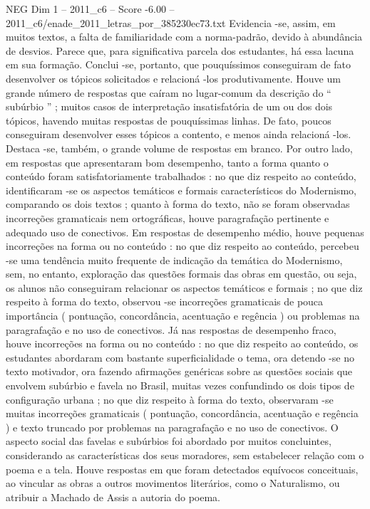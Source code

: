 \begin{textsample}{NEG Dim 1 – 2011\_c6 – Score -6.00 – 2011\_c6/enade\_2011\_letras\_por\_385230ec73.txt}
Evidencia -se, assim, em muitos textos, a falta de familiaridade com a norma-padrão, devido à abundância de desvios.
Parece que, para significativa parcela dos estudantes, há essa lacuna em sua formação.
Conclui -se, portanto, que pouquíssimos conseguiram de fato desenvolver os tópicos solicitados e relacioná -los produtivamente.
Houve um grande número de respostas que caíram no lugar-comum da descrição do “ subúrbio ” ; muitos casos de interpretação insatisfatória de um ou dos dois tópicos, havendo muitas respostas de pouquíssimas linhas.
De fato, poucos conseguiram desenvolver esses tópicos a contento, e menos ainda relacioná -los.
Destaca -se, também, o grande volume de respostas em branco.
Por outro lado, em respostas que apresentaram bom desempenho, tanto a forma quanto o conteúdo foram satisfatoriamente trabalhados : no que diz respeito ao conteúdo, identificaram -se os aspectos temáticos e formais característicos do Modernismo, comparando os dois textos ; quanto à forma do texto, não se foram observadas incorreções gramaticais nem ortográficas, houve paragrafação pertinente e adequado uso de conectivos.
Em respostas de desempenho médio, houve pequenas incorreções na forma ou no conteúdo : no que diz respeito ao conteúdo, percebeu -se uma tendência muito frequente de indicação da temática do Modernismo, sem, no entanto, exploração das questões formais das obras em questão, ou seja, os alunos não conseguiram relacionar os aspectos temáticos e formais ; no que diz respeito à forma do texto, observou -se incorreções gramaticais de pouca importância ( pontuação, concordância, acentuação e regência ) ou problemas na paragrafação e no uso de conectivos.
Já nas respostas de desempenho fraco, houve incorreções na forma ou no conteúdo : no que diz respeito ao conteúdo, os estudantes abordaram com bastante superficialidade o tema, ora detendo -se no texto motivador, ora fazendo afirmações genéricas sobre as questões sociais que envolvem subúrbio e favela no Brasil, muitas vezes confundindo os dois tipos de configuração urbana ; no que diz respeito à forma do texto, observaram -se muitas incorreções gramaticais ( pontuação, concordância, acentuação e regência ) e texto truncado por problemas na paragrafação e no uso de conectivos.
O aspecto social das favelas e subúrbios foi abordado por muitos concluintes, considerando as características dos seus moradores, sem estabelecer relação com o poema e a tela.
Houve respostas em que foram detectados equívocos conceituais, ao vincular as obras a outros movimentos literários, como o Naturalismo, ou atribuir a Machado de Assis a autoria do poema.

\end{textsample}

